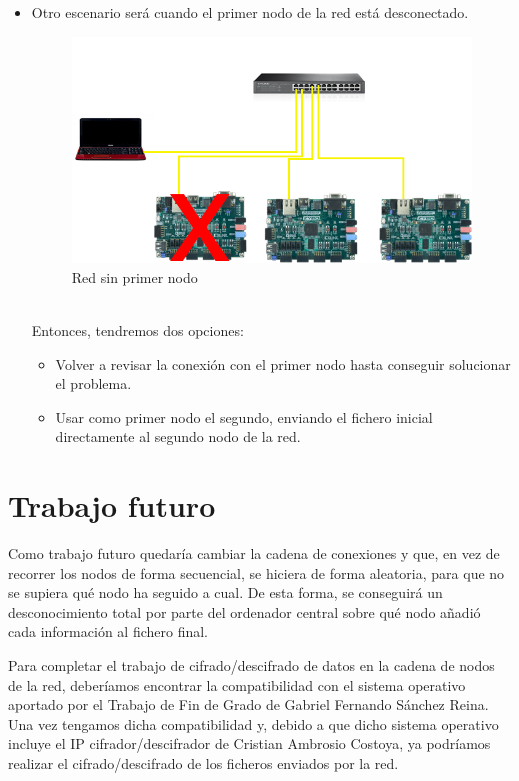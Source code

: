 \begin{itemize}
\begin{figure}[h]
	\end{figure}
	\item Otro escenario será cuando el primer nodo de la red está desconectado.
	\begin{figure}[h]
		\centering
		\includegraphics[scale=0.5]{Epilogo/RedSinNodo1.png}
		\caption{Red sin primer nodo}
		\label{Red sin primer nodo}
	\end{figure}\\
	Entonces, tendremos dos opciones:
	\begin{itemize}
		\item Volver a revisar la conexión con el primer nodo hasta conseguir solucionar el problema.
		\item Usar como primer nodo el segundo, enviando el fichero inicial directamente al segundo nodo de la red.
	\end{itemize}
\end{itemize}

\section{Trabajo futuro}
Como trabajo futuro quedaría cambiar la cadena de conexiones y que, en vez de recorrer los nodos de forma secuencial, se hiciera de forma aleatoria, para que no se supiera qué nodo ha seguido a cual. De esta forma, se conseguirá un desconocimiento total por parte del ordenador central sobre qué nodo añadió cada información al fichero final.

Para completar el trabajo de cifrado/descifrado de datos en la cadena de nodos de la red, deberíamos encontrar la compatibilidad con el sistema operativo aportado por el Trabajo de Fin de Grado de Gabriel Fernando Sánchez Reina. Una vez tengamos dicha compatibilidad y, debido a que dicho sistema operativo incluye el IP cifrador/descifrador de Cristian Ambrosio Costoya, ya podríamos realizar el cifrado/descifrado de los ficheros enviados por la red.

